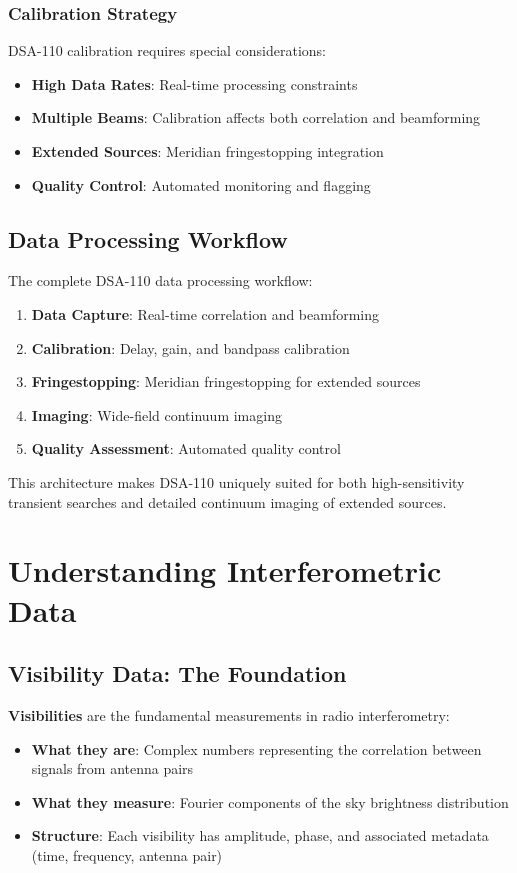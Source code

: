 \documentclass[11pt]{article}
\begin{document}
\subsubsection{Calibration Strategy}
DSA-110 calibration requires special considerations:

\begin{itemize}
    \item \textbf{High Data Rates}: Real-time processing constraints
    \item \textbf{Multiple Beams}: Calibration affects both correlation and beamforming
    \item \textbf{Extended Sources}: Meridian fringestopping integration
    \item \textbf{Quality Control}: Automated monitoring and flagging
\end{itemize}

\subsection{Data Processing Workflow}

The complete DSA-110 data processing workflow:

\begin{enumerate}
    \item \textbf{Data Capture}: Real-time correlation and beamforming
    \item \textbf{Calibration}: Delay, gain, and bandpass calibration
    \item \textbf{Fringestopping}: Meridian fringestopping for extended sources
    \item \textbf{Imaging}: Wide-field continuum imaging
    \item \textbf{Quality Assessment}: Automated quality control
\end{enumerate}

This architecture makes DSA-110 uniquely suited for both high-sensitivity transient searches and detailed continuum imaging of extended sources.

\section{Understanding Interferometric Data}

\subsection{Visibility Data: The Foundation}
\textbf{Visibilities} are the fundamental measurements in radio interferometry:
\begin{itemize}
    \item \textbf{What they are}: Complex numbers representing the correlation between signals from antenna pairs
    \item \textbf{What they measure}: Fourier components of the sky brightness distribution
    \item \textbf{Structure}: Each visibility has amplitude, phase, and associated metadata (time, frequency, antenna pair)
\end{itemize}
\end{document}
